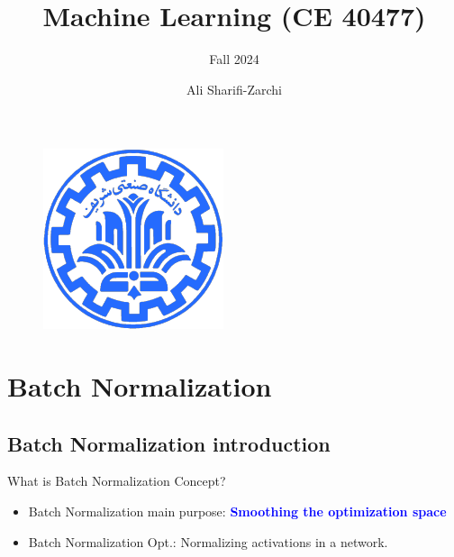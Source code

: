 \documentclass[serif, aspectratio=169]{beamer}
\author{Ali Sharifi-Zarchi}
\title{Machine Learning (CE 40477)}
\subtitle{Fall 2024}
\institute{
    CE Department \\
    Sharif University of Technology
}
\begin{document}
\begin{frame}
    \titlepage
    \vspace*{-0.6cm}
    \begin{figure}[htpb]
        \begin{center}
            \includegraphics[keepaspectratio, scale=0.25]{pic/sharif-main-logo.png}
        \end{center}
    \end{figure}
\end{frame}

\begin{frame}    
\tableofcontents[sectionstyle=show,
subsectionstyle=show/shaded/hide,
subsubsectionstyle=show/shaded/hide]
\end{frame}


\section{Batch Normalization}
\subsection{Batch Normalization introduction}
\begin{frame}{What is Batch Normalization Concept?}

\begin{itemize}
   \item Batch Normalization main purpose: \textcolor{blue}{\textbf{Smoothing the optimization space}}
   \item Batch Normalization Opt.: Normalizing activations in a network.
\end{itemize}

\end{frame}
\end{document}
